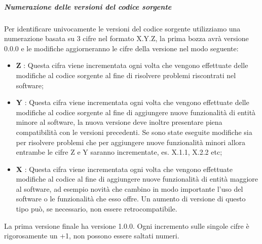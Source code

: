 		\subparagraph*{Numerazione delle versioni del codice sorgente}
		Per identificare univocamente le versioni del codice sorgente utilizziamo una numerazione basata su 3 cifre nel formato X.Y.Z, la prima bozza avrà versione 0.0.0 e le modifiche aggiorneranno le cifre della versione nel modo seguente:
		\begin{itemize}
			\item \textbf{Z} : Questa cifra viene incrementata ogni volta che vengono effettuate delle modifiche al codice sorgente al fine di risolvere problemi riscontrati nel software;
			\item \textbf{Y} : Questa cifra viene incrementata ogni volta che vengono effettuate delle modifiche al codice sorgente al fine di aggiungere nuove funzionalità di entità minore al software, la nuova versione deve inoltre presentare piena compatibilità con le versioni precedenti. Se sono state eseguite modifiche sia per risolvere problemi che per aggiungere nuove funzionalità minori allora entrambe le cifre Z e Y saranno incrementate, es. X.1.1, X.2.2 etc;
			\item \textbf{X} : Questa cifra viene incrementata ogni volta che vengono effettuate modifiche al codice al fine di aggiungere nuove funzionalità di entità maggiore al software, ad esempio novità che cambino in modo importante l'uso del software o le funzionalità che esso offre. Un aumento di versione di questo tipo può, se necessario, non essere retrocompatibile.
		\end{itemize}
		La prima versione finale ha versione 1.0.0.
		\newline
		Ogni incremento sulle singole cifre è rigorosamente un +1, non possono essere saltati numeri.
		

